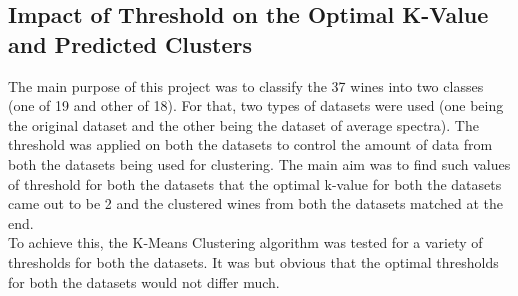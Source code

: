 \documentclass{article}
\begin{document}
\subsection{Impact of Threshold on the Optimal K-Value and Predicted Clusters}
The main purpose of this project was to classify the 37 wines into two classes (one of 19 and other of 18). For that, two types of datasets were used (one being the original dataset and the other being the dataset of average spectra). The threshold was applied on both the datasets to control the amount of data from both the datasets being used for clustering. The main aim was to find such values of threshold for both the datasets that the optimal k-value for both the datasets came out to be 2 and the clustered wines from both the datasets matched at the end. \\
\newline
To achieve this, the K-Means Clustering algorithm was tested for a variety of thresholds for both the datasets. It was but obvious that the optimal thresholds for both the datasets would not differ much.\\
\end{document}
